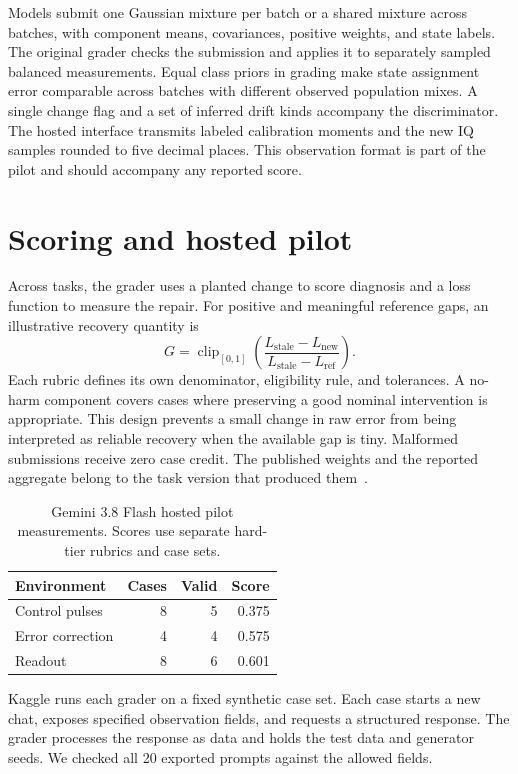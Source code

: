 \documentclass{article}
\begin{document}
Models submit one Gaussian mixture per batch or a shared mixture across batches, with component means, covariances, positive weights, and state labels. The original grader checks the submission and applies it to separately sampled balanced measurements. Equal class priors in grading make state assignment error comparable across batches with different observed population mixes. A single change flag and a set of inferred drift kinds accompany the discriminator. The hosted interface transmits labeled calibration moments and the new IQ samples rounded to five decimal places. This observation format is part of the pilot and should accompany any reported score.

\section{Scoring and hosted pilot}
Across tasks, the grader uses a planted change to score diagnosis and a loss function to measure the repair. For positive and meaningful reference gaps, an illustrative recovery quantity is
\[
G=\operatorname{clip}_{[0,1]}\!\left(\frac{L_{\mathrm{stale}}-L_{\mathrm{new}}}
 {L_{\mathrm{stale}}-L_{\mathrm{ref}}}\right).
\]
Each rubric defines its own denominator, eligibility rule, and tolerances. A no-harm component covers cases where preserving a good nominal intervention is appropriate. This design prevents a small change in raw error from being interpreted as reliable recovery when the available gap is tiny. Malformed submissions receive zero case credit. The published weights and the reported aggregate belong to the task version that produced them~\citep{draftbench}.

\begin{table}[t]
\centering\small
\caption{Gemini 3.8 Flash hosted pilot measurements. Scores use separate hard-tier rubrics and case sets.}
\label{tab:pilot}
\begin{tabular}{@{}lrrr@{}}
\toprule
Environment & Cases & Valid & Score \\
\midrule
Control pulses & 8 & 5 & 0.375 \\
Error correction & 4 & 4 & 0.575 \\
Readout & 8 & 6 & 0.601 \\
\bottomrule
\end{tabular}
\end{table}

Kaggle runs each grader on a fixed synthetic case set. Each case starts a new chat, exposes specified observation fields, and requests a structured response. The grader processes the response as data and holds the test data and generator seeds. We checked all 20 exported prompts against the allowed fields.
\end{document}
